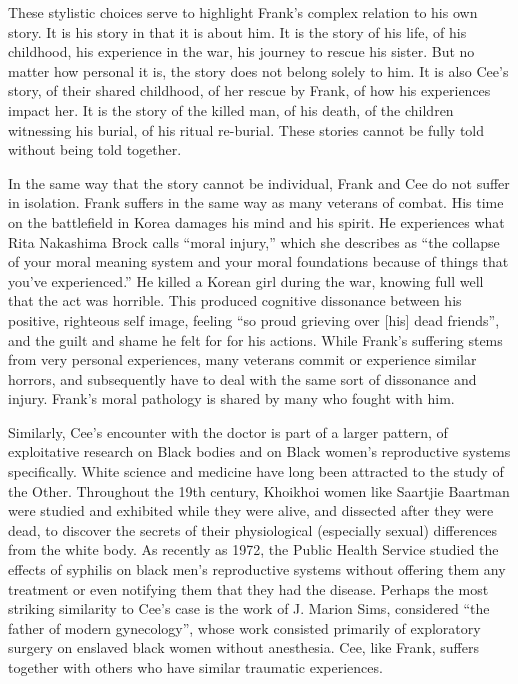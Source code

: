 \documentclass[12pt]{article}
\begin{document}
These stylistic choices serve to highlight Frank's complex relation to his own
story. It is his story in that it is about him. It is the story of his life, of
his childhood, his experience in the war, his journey to rescue his sister. But
no matter how personal it is, the story does not belong solely to him. It is
also Cee's story, of their shared childhood, of her rescue by Frank, of how his
experiences impact her. It is the story of the killed man, of his death, of the
children witnessing his burial, of his ritual re-burial. These stories cannot
be fully told without being told together.

In the same way that the story cannot be individual, Frank and Cee do not
suffer in isolation. Frank suffers in the same way as many veterans of combat.
His time on the battlefield in Korea damages his mind and his spirit. He
experiences what Rita Nakashima Brock calls ``moral injury,'' which she
describes as ``the collapse of your moral meaning system and your moral
foundations because of things that you've experienced.''\autocite{Brock15} He
killed a Korean girl during the war, knowing full well that the act was
horrible. This produced cognitive dissonance between his positive, righteous
self image, feeling ``so proud grieving over [his] dead friends'',\autocite[p.
133]{Morrison12} and the guilt and shame he felt for for his actions. While
Frank's suffering stems from very personal experiences, many veterans commit or
experience similar horrors, and subsequently have to deal with the same sort of
dissonance and injury. Frank's moral pathology is shared by many who fought
with him.

Similarly, Cee's encounter with the doctor is part of a larger pattern, of
exploitative research on Black bodies and on Black women's reproductive systems
specifically. White science and medicine have long been attracted to the study
of the Other. Throughout the 19th century, Khoikhoi women like Saartjie
Baartman were studied and exhibited while they were alive, and dissected after
they were dead, to discover the secrets of their physiological (especially
sexual) differences from the white body.\autocite{Qureshi04} As recently as
1972, the Public Health Service studied the effects of syphilis on black men's
reproductive systems without offering them any treatment or even notifying them
that they had the disease. Perhaps the most striking similarity to Cee's case
is the work of J. Marion Sims, considered ``the father of modern gynecology'',
whose work consisted primarily of exploratory surgery on enslaved black women
without anesthesia.\autocite{Spettel11} Cee, like Frank, suffers together with
others who have similar traumatic experiences.
\end{document}
